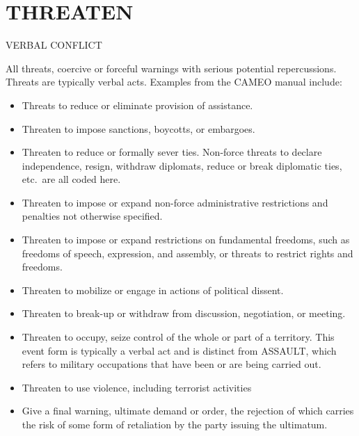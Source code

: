 \documentclass[11pt]{report}
\newcommand{\plcat}[1]{\textsf{#1}}
\begin{document}
\newpage  


\section{THREATEN}

\textsf{VERBAL CONFLICT} \vspace{8pt}

All threats, coercive or forceful warnings with serious potential repercussions. Threats are typically verbal acts. Examples from the CAMEO manual include:

\begin{itemize}

\item Threats to reduce or eliminate provision of assistance.

\item Threaten to impose sanctions, boycotts, or embargoes.

\item Threaten to reduce or formally sever ties. Non-force threats to declare independence, resign, withdraw diplomats, reduce or break diplomatic ties, etc.\ are all coded here.

\item Threaten to impose or expand non-force administrative restrictions and penalties not otherwise specified.

\item Threaten to impose or expand restrictions on fundamental freedoms, such as freedoms of speech, expression, and assembly, or threats to restrict rights and freedoms.

\item Threaten to mobilize or engage in actions of political dissent.

\item Threaten to break-up or withdraw from discussion, negotiation, or meeting.

\item Threaten to occupy, seize control of the whole or part of a territory.  This event form is typically a verbal act and is distinct from \plcat{ASSAULT}, which refers to military occupations that have been or are being carried out.
\item Threaten to use violence, including terrorist activities

\item Give a final warning, ultimate demand or order, the rejection of which carries the risk of some form of retaliation by the party issuing the ultimatum. 
\end{itemize}
\end{document}
